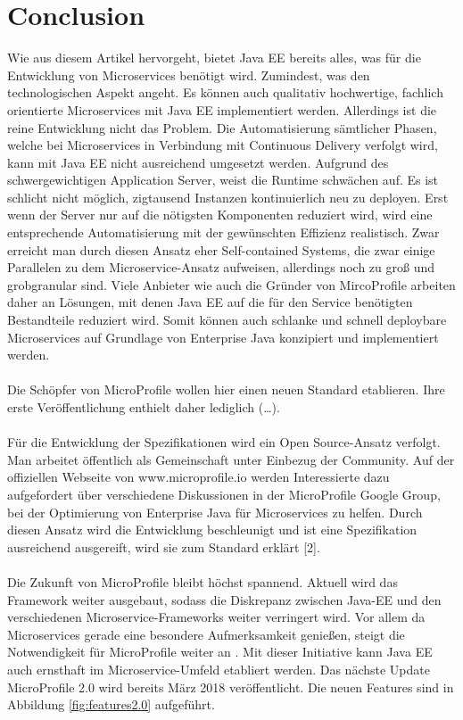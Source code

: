 \section{Conclusion}
Wie aus diesem Artikel hervorgeht, bietet Java EE bereits alles, was für die Entwicklung von Microservices benötigt wird. Zumindest, was den technologischen Aspekt angeht. Es können auch qualitativ hochwertige, fachlich orientierte Microservices mit Java EE implementiert werden. Allerdings ist die reine Entwicklung nicht das Problem. Die Automatisierung sämtlicher Phasen, welche bei Microservices in Verbindung mit Continuous Delivery verfolgt wird, kann mit Java EE nicht ausreichend umgesetzt werden. Aufgrund des schwergewichtigen Application Server, weist die Runtime schwächen auf. Es ist schlicht nicht möglich, zigtausend Instanzen kontinuierlich neu zu deployen. Erst wenn der Server nur auf die nötigsten Komponenten reduziert wird, wird eine entsprechende Automatisierung mit der gewünschten Effizienz realistisch. Zwar erreicht man durch diesen Ansatz eher Self-contained Systems, die zwar einige Parallelen zu dem Microservice-Ansatz aufweisen, allerdings noch zu groß und grobgranular sind. Viele Anbieter wie auch die Gründer von MircoProfile arbeiten daher an Lösungen, mit denen Java EE auf die für den Service benötigten Bestandteile reduziert wird. Somit können auch schlanke und schnell deploybare Microservices auf Grundlage von Enterprise Java konzipiert und implementiert werden.\\ \\
Die Schöpfer von MicroProfile wollen hier einen neuen Standard etablieren. Ihre erste Veröffentlichung enthielt daher lediglich (…). \\ \\
Für die Entwicklung der Spezifikationen wird ein Open Source-Ansatz verfolgt. Man arbeitet öffentlich als Gemeinschaft unter Einbezug der Community. Auf der offiziellen Webseite von www.microprofile.io werden Interessierte dazu aufgefordert über verschiedene Diskussionen in der MicroProfile Google Group, bei der Optimierung von Enterprise Java für Microservices zu helfen. Durch diesen Ansatz wird die Entwicklung beschleunigt und ist eine Spezifikation ausreichend ausgereift, wird sie zum Standard erklärt [2].  \\ \\
Die Zukunft von MicroProfile bleibt höchst spannend. Aktuell wird das Framework weiter ausgebaut, sodass die Diskrepanz zwischen Java-EE und den verschiedenen Microservice-Frameworks weiter verringert wird. Vor allem da Microservices gerade eine besondere Aufmerksamkeit genießen, steigt die Notwendigkeit für MicroProfile weiter an \cite{LarsRowekamp.2018}. Mit dieser Initiative kann Java EE auch ernsthaft im Microservice-Umfeld etabliert werden. Das nächste Update MicroProfile 2.0 wird bereits März 2018 veröffentlicht. Die neuen Features sind in Abbildung \ref{fig:features2.0} aufgeführt. 

